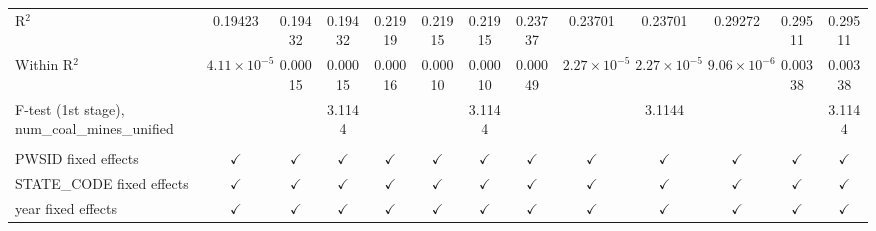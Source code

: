 \begin{table}[htbp]
\begin{adjustbox}{width = \textwidth, center}
\begin{tabular}{lcccccccccccc}
         R$^2$                                            & 0.19423               & 0.19432       & 0.19432       & 0.21919       & 0.21915       & 0.21915       & 0.23737       & 0.23701               & 0.23701               & 0.29272               & 0.29511        & 0.29511\\  
         Within R$^2$                                     & $4.11\times 10^{-5}$  & 0.00015       & 0.00015       & 0.00016       & 0.00010       & 0.00010       & 0.00049       & $2.27\times 10^{-5}$  & $2.27\times 10^{-5}$  & $9.06\times 10^{-6}$  & 0.00338        & 0.00338\\  
         F-test (1st stage), num\_coal\_mines\_unified    &                       &               & 3.1144        &               &               & 3.1144        &               &                       & 3.1144                &                       &                & 3.1144\\  
          \\
         PWSID fixed effects                              & $\checkmark$          & $\checkmark$  & $\checkmark$  & $\checkmark$  & $\checkmark$  & $\checkmark$  & $\checkmark$  & $\checkmark$          & $\checkmark$          & $\checkmark$          & $\checkmark$   & $\checkmark$\\   
         STATE\_CODE fixed effects                        & $\checkmark$          & $\checkmark$  & $\checkmark$  & $\checkmark$  & $\checkmark$  & $\checkmark$  & $\checkmark$  & $\checkmark$          & $\checkmark$          & $\checkmark$          & $\checkmark$   & $\checkmark$\\   
         year fixed effects                               & $\checkmark$          & $\checkmark$  & $\checkmark$  & $\checkmark$  & $\checkmark$  & $\checkmark$  & $\checkmark$  & $\checkmark$          & $\checkmark$          & $\checkmark$          & $\checkmark$   & $\checkmark$\\   
         \bottomrule
      \end{tabular}
   \end{adjustbox}
\end{table}


